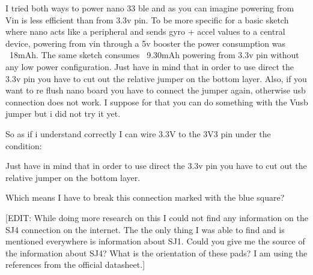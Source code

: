 I tried both ways to power nano 33 ble and as you can imagine powering from Vin is less efficient than from 3.3v pin. To be more specific for a basic sketch where nano acts like a peripheral and sends gyro + accel values to a central device, powering from vin through a 5v booster the power consumption was ~18mAh. The same sketch consumes ~9.30mAh powering from 3.3v pin without any low power configuration. Just have in mind that in order to use direct the 3.3v pin you have to cut out the relative jumper on the bottom layer. Also, if you want to re flush nano board you have to connect the jumper again, otherwise usb connection does not work. I suppose for that you can do something with the Vusb jumper but i did not try it yet.


So as if i understand correctly I can wire 3.3V to the 3V3 pin under the condition:

Just have in mind that in order to use direct the 3.3v pin you have to cut out the relative jumper on the bottom layer.

Which means I have to break this connection marked with the blue square?

[EDIT: While doing more research on this I could not find any information on the SJ4 connection on the internet. The the only thing I was able to find and is mentioned everywhere is information about SJ1. Could you give me the source of the information about SJ4? What is the orientation of these pads? I am using the references from the official datasheet.]








